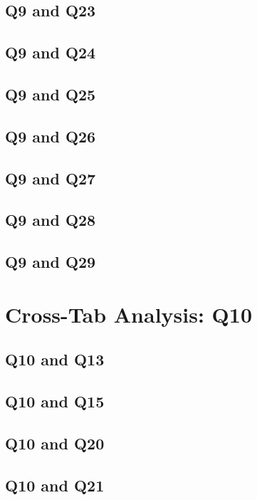 \documentclass{report}
\begin{document}
\section{Q9 and Q23}\clearpage
\section{Q9 and Q24}\clearpage
\section{Q9 and Q25}\clearpage
\section{Q9 and Q26}\clearpage
\section{Q9 and Q27}\clearpage
\section{Q9 and Q28}\clearpage
\section{Q9 and Q29}\clearpage

\chapter{Cross-Tab Analysis: Q10}

\section{Q10 and Q13}\clearpage
\section{Q10 and Q15}\clearpage
\section{Q10 and Q20}\clearpage
\section{Q10 and Q21}\clearpage
\end{document}
